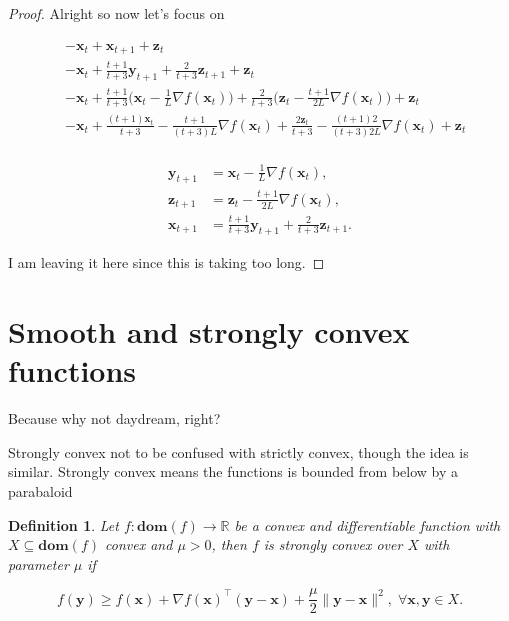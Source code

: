\documentclass{article}
\newtheorem{definition}[theorem]{Definition}
\begin{document}
\begin{proof}
		Alright so now let's focus on
		
		\begin{align*}
			&-\mathbf{x}_t + \mathbf{x}_{t+1} + \mathbf{z}_t\\
			&-\mathbf{x}_t + \frac{t+1}{t+3}\mathbf{y}_{t+1} + \frac{2}{t+3}\mathbf{z}_{t+1} + \mathbf{z}_t\\
			&-\mathbf{x}_t + \frac{t+1}{t+3}\bigg( \mathbf{x}_t - \frac{1}{L}\nabla f(\mathbf{x}_t) \bigg)+ \frac{2}{t+3}\bigg( \mathbf{z}_t - \frac{t+1}{2L}\nabla f(\mathbf{x}_t) \bigg) + \mathbf{z}_t\\
			&-\mathbf{x}_t + \frac{(t+1)\mathbf{x}_t}{t+3} - \frac{t+1}{(t+3)L}\nabla f(\mathbf{x}_t)+ \frac{2\mathbf{z}_t}{t+3}  - \frac{(t+1)2}{(t+3)2L}\nabla f(\mathbf{x}_t) + \mathbf{z}_t\\
		\end{align*}
		
		\begin{align*}
			\mathbf{y}_{t+1} &= \mathbf{x}_t - \frac{1}{L}\nabla f(\mathbf{x}_t),\\
			\mathbf{z}_{t+1} &= \mathbf{z}_t - \frac{t+1}{2L}\nabla f(\mathbf{x}_t),\\
			\mathbf{x}_{t+1} &= \frac{t+1}{t+3}\mathbf{y}_{t+1} + \frac{2}{t+3}\mathbf{z}_{t+1}.
		\end{align*}

		I am leaving it here since this is taking too long.
		\end{proof}

\section{Smooth and strongly convex functions}

	Because why not daydream, right?
	
	Strongly convex not to be confused with strictly convex, though the idea is similar. Strongly convex means the functions is bounded from below by a parabaloid
	
	\begin{definition}
		Let $f:\mathbf{dom}(f)\to\mathbb{R}$ be a convex and differentiable function with $X\subseteq\mathbf{dom}(f)$ convex and $\mu> 0$, then $f$ is strongly convex over $X$ with parameter $\mu$ if
		
		\[ f(\mathbf{y}) \ge f(\mathbf{x}) + \nabla f(\mathbf{x})^\top(\mathbf{y-x}) + \frac{\mu}{2} \|\mathbf{y-x}\|^2,\;\forall\mathbf{x, y}\in X. \]
	\end{definition}
	
\end{document}
